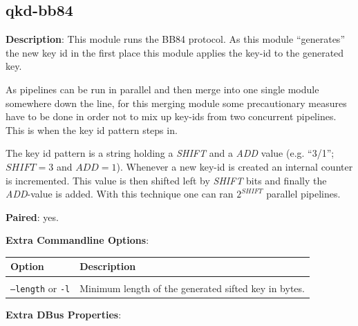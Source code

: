 \clearpage


\subsection{qkd-bb84}
\label{subsec:qkd-bb84}

\textbf{Description}: This module runs the BB84 protocol. As this module ``generates'' the new key id in the first place this module applies the key-id to the generated key.

\medskip

As pipelines can be run in parallel and then merge into one single module somewhere down the line, for this merging module some precautionary measures have to be done in order not to mix up key-ids from two concurrent pipelines. This is when the key id pattern steps in.

\medskip

The key id pattern is a string holding a \emph{SHIFT} and a \emph{ADD} value (e.g. ``3/1''; $SHIFT = 3$ and $ADD = 1$). Whenever a new key-id is created an internal counter is incremented. This value is then shifted left by \emph{SHIFT} bits and finally the \emph{ADD}-value is added. With this technique one can ran $2^{SHIFT}$ parallel pipelines.

\bigskip

\noindent \textbf{Paired}: yes.

\bigskip

\noindent \textbf{Extra Commandline Options}: 

\medskip

\begin{tabular}{lp{10cm}}

Option                              & Description \\
\hline
\\
\texttt{--length} or \texttt{-l}    & Minimum length of the generated sifted key in bytes. \\ [0.5em]

\end{tabular}

\bigskip

\noindent \textbf{Extra DBus Properties}:

\medskip

